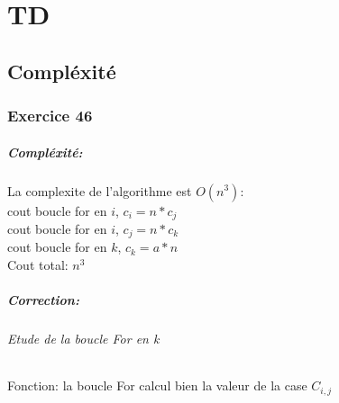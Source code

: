 \documentclass[12pt]{report}
\begin{document}
\chapter{TD}

\section{}
\section{Compléxité}

\subsection*{Exercice 46}

\begin{center}
\end{center}

\paragraph*{Compléxité:}
La complexite de l'algorithme est $O(n^3)$:\\
cout boucle for en $i$, $c_i = n * c_j$\\
cout boucle for en $i$, $c_j = n * c_k$\\
cout boucle for en $k$, $c_k = a*n$\\
Cout total: $n^3$

\paragraph*{Correction:}

\subparagraph*{Etude de la boucle For en k}

Fonction: la boucle For calcul bien la valeur de la case $C_{i,j}$
\end{document}
